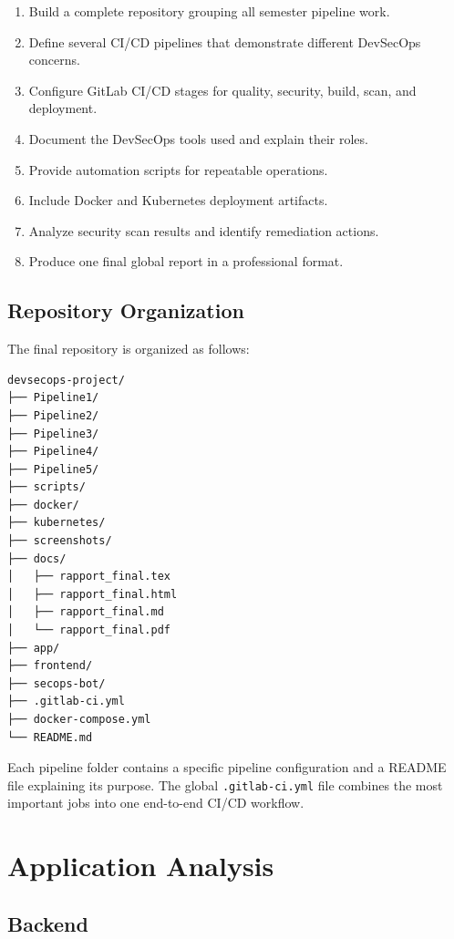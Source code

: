 \documentclass[12pt,a4paper]{report}
\begin{document}
\begin{enumerate}[leftmargin=*]
    \item Build a complete repository grouping all semester pipeline work.
    \item Define several CI/CD pipelines that demonstrate different DevSecOps concerns.
    \item Configure GitLab CI/CD stages for quality, security, build, scan, and deployment.
    \item Document the DevSecOps tools used and explain their roles.
    \item Provide automation scripts for repeatable operations.
    \item Include Docker and Kubernetes deployment artifacts.
    \item Analyze security scan results and identify remediation actions.
    \item Produce one final global report in a professional format.
\end{enumerate}

\section{Repository Organization}

The final repository is organized as follows:

\begin{lstlisting}[language=bash,caption={Repository structure}]
devsecops-project/
├── Pipeline1/
├── Pipeline2/
├── Pipeline3/
├── Pipeline4/
├── Pipeline5/
├── scripts/
├── docker/
├── kubernetes/
├── screenshots/
├── docs/
│   ├── rapport_final.tex
│   ├── rapport_final.html
│   ├── rapport_final.md
│   └── rapport_final.pdf
├── app/
├── frontend/
├── secops-bot/
├── .gitlab-ci.yml
├── docker-compose.yml
└── README.md
\end{lstlisting}

Each pipeline folder contains a specific pipeline configuration and a README file explaining its purpose. The global \texttt{.gitlab-ci.yml} file combines the most important jobs into one end-to-end CI/CD workflow.

\chapter{Application Analysis}

\section{Backend}
\end{document}
